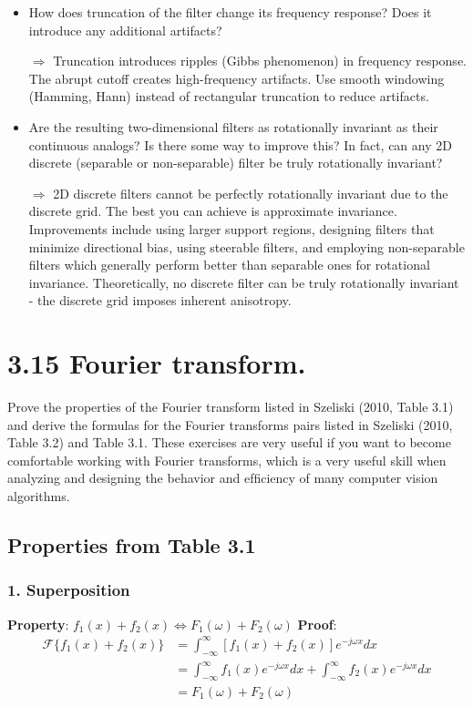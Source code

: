 \documentclass[12pt,a4paper]{article}
\begin{document}
\begin{itemize}
    \item How does truncation of the ﬁlter change its frequency response? Does it introduce any
additional artifacts?

$\Rightarrow$ Truncation introduces ripples (Gibbs phenomenon) in frequency response. The abrupt cutoff creates 
high-frequency artifacts. Use smooth windowing (Hamming, Hann) instead of rectangular truncation to reduce artifacts.
    \item Are the resulting two-dimensional ﬁlters as rotationally invariant as their continuous
analogs? Is there some way to improve this? In fact, can any 2D discrete (separable or
non-separable) ﬁlter be truly rotationally invariant?

$\Rightarrow$ 2D discrete filters cannot be perfectly rotationally invariant due to the discrete grid. The best 
you can achieve is approximate invariance. Improvements include using larger support regions, designing filters that 
minimize directional bias, using steerable filters, and employing non-separable filters which generally perform better 
than separable ones for rotational invariance. Theoretically, no discrete filter can be truly rotationally invariant - 
the discrete grid imposes inherent anisotropy.
\end{itemize}


\section*{3.15 Fourier transform.}
Prove the properties of the Fourier transform listed in Szeliski (2010, Table 3.1) and derive the formulas for the Fourier 
transforms pairs listed in Szeliski (2010, Table 3.2) and Table 3.1. These exercises are very useful if you want to become 
comfortable working with Fourier transforms, which is a very useful skill when analyzing and designing the behavior and 
efﬁciency of many computer vision algorithms.

\subsection*{Properties from Table 3.1}

\subsubsection*{1. Superposition}
\textbf{Property}: $f_1(x) + f_2(x) \Leftrightarrow F_1(\omega) + F_2(\omega)$
\newline
\textbf{Proof}:
\begin{align*}
\mathcal{F}\{f_1(x) + f_2(x)\} &= \int_{-\infty}^{\infty} [f_1(x) + f_2(x)]e^{-j\omega x}dx\\
&= \int_{-\infty}^{\infty} f_1(x)e^{-j\omega x}dx + \int_{-\infty}^{\infty} f_2(x)e^{-j\omega x}dx\\
&= F_1(\omega) + F_2(\omega)
\end{align*}
\end{document}
